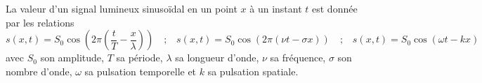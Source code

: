 












\hauteurLargeurCadreReponse		{6mm}{2cm}
\initialisationEntrainement

La valeur d'un signal lumineux sinusoïdal en un point $x$ à un instant $t$ est donnée par les relations
$$ s(x,t) = S_0 \cos \left( 2\pi \left( \frac{t}{T} - \frac{x}{\lambda} \right)\right)
\quad \text{;} \quad
s(x,t) = S_0 \cos \left( 2\pi \left( \nu t - \sigma x \right) \right)
\quad \text{;} \quad
s(x,t) = S_0 \cos \left( \omega t - k x \right) $$
avec $S_0$ son amplitude, $T$ sa période, $\lambda$ sa longueur d'onde, $\nu$ sa fréquence, $\sigma$ son nombre d'onde, $\omega$ sa pulsation temporelle et $k$ sa pulsation spatiale.

